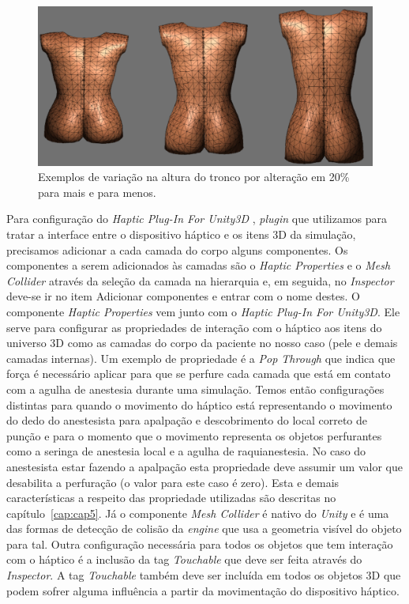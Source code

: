 \begin{figure}[ht!]
    \centering
    \includegraphics[width=0.9\linewidth]{capitulos/figuras/alteracao-modelo-altura.png} 
    \caption{Exemplos de variação na altura do tronco por alteração em 20\% para mais e para menos.}
    \label{fig:alteracaoModeloAltura}
\end{figure}

Para configuração do \textit{Haptic Plug-In For Unity3D} \cite{Poyade2014}, \textit{plugin} que utilizamos para tratar a interface entre o dispositivo háptico e os itens 3D da simulação, precisamos adicionar a cada camada do corpo alguns componentes. Os componentes a serem adicionados às camadas são o \textit{Haptic Properties} e o \textit{Mesh Collider} através da seleção da camada na hierarquia e, em seguida, no \textit{Inspector} deve-se ir no item Adicionar componentes e entrar com o nome destes. O componente \textit{Haptic Properties} vem junto com o \textit{Haptic Plug-In For Unity3D}. Ele serve para configurar as propriedades de interação com o háptico aos itens do universo 3D como as camadas do corpo da paciente no nosso caso (pele e demais camadas internas). Um exemplo de propriedade é a \textit{Pop Through} que indica que força é necessário aplicar para que se perfure cada camada que está em contato com a agulha de anestesia durante uma simulação. Temos então configurações distintas para quando o movimento do háptico está representando o movimento do dedo do anestesista para apalpação e descobrimento do local correto de punção e para o momento que o movimento representa os objetos perfurantes como a seringa de anestesia local e a agulha de raquianestesia. No caso do anestesista estar fazendo a apalpação esta propriedade deve assumir um valor que desabilita a perfuração (o valor para este caso é zero). Esta e demais características a respeito das propriedade utilizadas são descritas no capítulo~\ref{cap:cap5}. Já o componente \textit{Mesh Collider} é nativo do \textit{Unity} e é uma das formas de detecção de colisão da \textit{engine} que usa a geometria visível do objeto para tal. Outra configuração necessária para todos os objetos que tem interação com o háptico é a inclusão da tag \textit{Touchable} que deve ser feita através do \textit{Inspector}. A tag \textit{Touchable} também deve ser incluída em todos os objetos 3D que podem sofrer alguma influência a partir da movimentação do dispositivo háptico.

